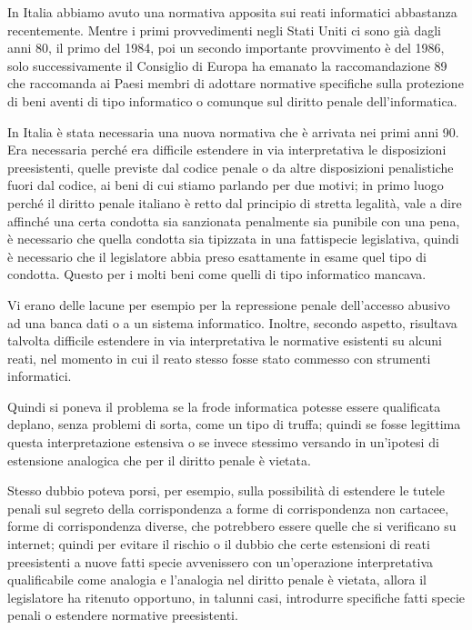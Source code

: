 In Italia abbiamo avuto una normativa apposita sui reati informatici abbastanza recentemente. Mentre i primi provvedimenti negli Stati Uniti ci sono già dagli anni 80, il primo del 1984, poi un secondo importante provvimento è del 1986, solo successivamente il Consiglio di Europa ha emanato la raccomandazione 89 che raccomanda ai Paesi membri di adottare normative specifiche sulla protezione di beni aventi di tipo informatico o comunque sul diritto penale dell'informatica. 

In Italia è stata necessaria una nuova normativa che è arrivata nei primi anni 90. Era necessaria perché era difficile estendere in via interpretativa le disposizioni preesistenti, quelle previste dal codice penale o da altre disposizioni penalistiche fuori dal codice, ai beni di cui stiamo parlando per due motivi; in primo luogo perché il diritto penale italiano è retto dal principio di stretta legalità, vale a dire affinché una certa condotta sia sanzionata penalmente sia punibile con una pena, è necessario che quella condotta sia tipizzata in una fattispecie legislativa, quindi è necessario che il legislatore abbia preso esattamente in esame quel tipo di condotta. Questo per i molti beni come quelli di tipo informatico mancava. 

Vi erano delle lacune per esempio per la repressione penale dell'accesso abusivo ad una banca dati o a un sistema informatico. Inoltre, secondo aspetto, risultava talvolta difficile estendere in via interpretativa le normative esistenti su alcuni reati, nel momento in cui il reato stesso fosse stato commesso con strumenti informatici. 

Quindi si poneva il problema se la frode informatica potesse essere qualificata deplano, senza problemi di sorta, come un tipo di truffa; quindi se fosse legittima questa interpretazione estensiva o se invece stessimo versando in un'ipotesi di estensione analogica che per il diritto penale è vietata. 

Stesso dubbio poteva porsi, per esempio, sulla possibilità di estendere le tutele penali sul segreto della corrispondenza a forme di corrispondenza non cartacee, forme di corrispondenza diverse, che potrebbero essere quelle che si verificano su internet; quindi per evitare il rischio o il dubbio che certe estensioni di reati preesistenti a nuove fatti specie avvenissero con un'operazione interpretativa qualificabile come analogia e l'analogia nel diritto penale è vietata, allora il legislatore ha ritenuto opportuno, in talunni casi, introdurre specifiche fatti specie penali o estendere normative preesistenti. 

